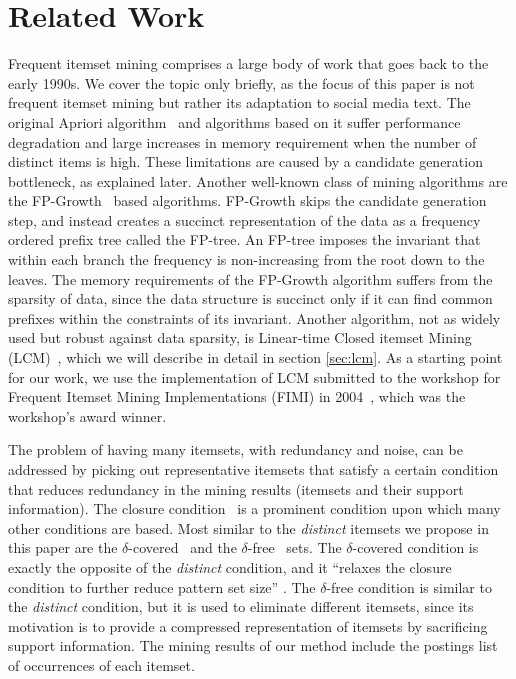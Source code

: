 \documentclass[letterpaper,12pt,titlepage,oneside,final]{book}
\begin{document}
\section{Related Work}
\label{sec:related}
Frequent itemset mining comprises a large body of work that goes back to the
early 1990s.
We cover the topic only briefly, as the focus of this paper is not frequent
itemset mining but rather its adaptation to social media text.
The original Apriori algorithm~\cite{agrawal1994fast} and algorithms based on
it suffer performance degradation and  large increases in memory requirement
when the number of distinct items is high.
These limitations are caused by a candidate generation bottleneck,
as explained later.
Another well-known class of mining algorithms are the
FP-Growth~\cite{han2000mining} based algorithms.
FP-Growth skips the candidate generation step, and instead creates a succinct
representation of the data as a frequency ordered prefix tree called the
FP-tree.
An FP-tree imposes the invariant that within each branch the frequency is
non-increasing from the root down to the leaves. 
The memory requirements of the FP-Growth algorithm suffers from the sparsity
of data, since the data structure is succinct only if it can find common
prefixes within the constraints of its invariant. 
Another algorithm, not as widely used but robust against data sparsity, is
Linear-time Closed itemset Mining (LCM)~\cite{uno2004lcm},
which we will describe in detail in section \ref{sec:lcm}.
As a starting point for our work, we use the implementation of LCM submitted
to the workshop for Frequent Itemset Mining Implementations (FIMI) in
2004~\cite{DBLP:conf/fimi/2004}, which was the workshop's award winner. 

The problem of having many itemsets, with redundancy and noise, can be addressed by
picking out  representative itemsets that satisfy a certain condition
that reduces redundancy in the mining results (itemsets and their support information).
The closure condition~\cite{pasquier1999discovering} is a prominent condition
upon which many other conditions are based.
Most similar to the \emph{distinct} itemsets we propose in this paper
are the $\delta$-covered~\cite{xin2005mining} and the
$\delta$-free~\cite{boulicaut2003free} sets.
The $\delta$-covered condition is exactly the opposite of the \emph{distinct}
condition, and it ``relaxes the closure condition to further reduce pattern
set size'' \cite{liu2012finding}.
The $\delta$-free condition is similar to the \emph{distinct} condition,
but it is used to eliminate different itemsets, since its motivation
is to provide a compressed representation of itemsets by sacrificing support
information. The mining results of our method include the postings list of
occurrences of each itemset.
\end{document}
